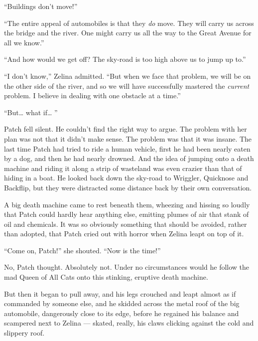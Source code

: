 \documentclass[ebook,oneside,openany,17pt]{memoir}
\newenvironment{tolerant}[1]{%
  \par\tolerance=#1\relax
}{%
  \par
}
\begin{document}
“Buildings don’t move!”

“The entire appeal of automobiles is that they \emph{do} move. They
will carry us across the bridge and the river. One might carry us all
the way to the Great Avenue for all we know.”

“And how would we get off? The sky-road is too high above us to jump
up to.”

“I don’t know,” Zelina admitted. “But when we face that problem, we
will be on the other side of the river, and so we will have
successfully mastered the \emph{current} problem. I believe in
dealing with one obstacle at a time.”

“But… what if… ”

Patch fell silent. He couldn’t find the right way to argue. The
problem with her plan was not that it didn’t make sense. The problem
was that it was insane. The last time Patch had tried to ride a human
vehicle, first he had been nearly eaten by a dog, and then he had
nearly drowned. And the idea of jumping onto a death machine and
riding it along a strip of wasteland was even crazier than that of
hiding in a boat. He looked back down the sky-road to Wriggler,
Quicknose and Backflip, but they were distracted some distance back by
their own conversation.

\begin{tolerant}{500}
A big death machine came to rest beneath them, wheezing and hissing so
loudly that Patch could hard\-ly hear anything else, emitting plumes of
air that stank of oil and chemicals. It was so obviously something
that should be avoided, rather than adopted, that Patch cried out with
horror when Zelina leapt on top of it.
\end{tolerant}

“Come on, Patch!” she shouted. “Now is the time!”

No, Patch thought. Absolutely not. Under no circumstances would he
follow the mad Queen of All Cats onto this stinking, eruptive death
machine.

\begin{tolerant}{500}
But then it began to pull away, and his legs crouch\-ed and leapt almost
as if commanded by someone else, and he skidded across the metal roof
of the big automobile, dangerously close to its edge, before he
regained his balance and scampered next to Zelina — skated, really,
his claws clicking against the cold and slippery roof.
\end{tolerant}
\end{document}
